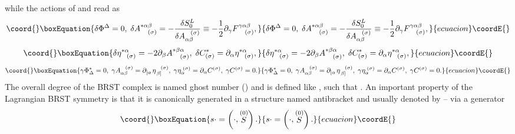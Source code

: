 \documentclass[a4paper,12pt]{article}
\begin{document}
while the actions of \myHighlight{$\delta $}\coordHE{} and \myHighlight{$\gamma $}\coordHE{} read as 
\begin{equation}\coord{}\boxEquation{
\delta \Phi ^{\Delta }=0,\;\delta A_{\;\;\;\;(\sigma )}^{*\alpha \beta }=-
\frac{\delta S_{0}^{L}}{\delta A_{\alpha \beta }^{\;\;\;(\sigma )}}\equiv -
\frac{1}{2}\partial _{\gamma }F_{\;\;\;\;(\sigma )}^{\gamma \alpha \beta },
\label{fcol19}
}{
\delta \Phi ^{\Delta }=0,\;\delta A_{\;\;\;\;(\sigma )}^{*\alpha \beta }=-
\frac{\delta S_{0}^{L}}{\delta A_{\alpha \beta }^{\;\;\;(\sigma )}}\equiv -
\frac{1}{2}\partial _{\gamma }F_{\;\;\;\;(\sigma )}^{\gamma \alpha \beta },
}{ecuacion}\coordE{}\end{equation}
\begin{equation}\coord{}\boxEquation{
\delta \eta _{\;\;\;(\sigma )}^{*\alpha }=-2\partial _{\beta
}A_{\;\;\;\;(\sigma )}^{*\beta \alpha },\;\delta C_{(\sigma )}^{*}=\partial
_{\alpha }\eta _{\;\;\;(\sigma )}^{*\alpha },  \label{fcol20}
}{
\delta \eta _{\;\;\;(\sigma )}^{*\alpha }=-2\partial _{\beta
}A_{\;\;\;\;(\sigma )}^{*\beta \alpha },\;\delta C_{(\sigma )}^{*}=\partial
_{\alpha }\eta _{\;\;\;(\sigma )}^{*\alpha },  }{ecuacion}\coordE{}\end{equation}
\begin{equation}\coord{}\boxEquation{
\gamma \Phi _{\Delta }^{*}=0,\;\gamma A_{\alpha \beta }^{\;\;\;(\sigma
)}=\partial _{\left[ \alpha \right. }\eta _{\left. \beta \right]
}^{\;\;\;(\sigma )},\;\gamma \eta _{\alpha }^{\;(\sigma )}=\partial _{\alpha
}C^{(\sigma )},\;\gamma C^{(\sigma )}=0.  \label{fcol21}
}{
\gamma \Phi _{\Delta }^{*}=0,\;\gamma A_{\alpha \beta }^{\;\;\;(\sigma
)}=\partial _{\left[ \alpha \right. }\eta _{\left. \beta \right]
}^{\;\;\;(\sigma )},\;\gamma \eta _{\alpha }^{\;(\sigma )}=\partial _{\alpha
}C^{(\sigma )},\;\gamma C^{(\sigma )}=0.  }{ecuacion}\coordE{}\end{equation}
The overall degree of the BRST complex is named ghost number (\coordHE{})
and is defined like \coordHE{}, such that \coordHE{}. An important property of the Lagrangian BRST
symmetry is that it is canonically generated in a structure named
antibracket and usually denoted by \myHighlight{$\left( ,\right) $}\coordHE{} \cite{rusi1}--\cite
{35and13} via a generator \coordHE{}%
\begin{equation}\coord{}\boxEquation{
s\cdot =\left( \cdot ,\stackrel{(0)}{S}\right) .  \label{fcol21a}
}{
s\cdot =\left( \cdot ,\stackrel{(0)}{S}\right) .  }{ecuacion}\coordE{}\end{equation}
\end{document}
